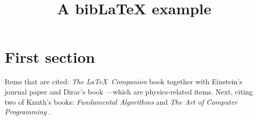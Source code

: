 \documentclass{article}
\title{A bibLaTeX example}
\begin{document}
	\section{First section}
	
	Items that are cited: \textit{The \LaTeX\ Companion} book \cite{latexcompanion} together with Einstein's journal paper \cite{einstein} and Dirac's book \cite{dirac}---which are physics-related items. Next, citing two of Knuth's books: \textit{Fundamental Algorithms} \cite{knuth-fa} and \textit{The Art of Computer Programming} \cite{knuth-acp}.
	
	\medskip
	
	\printbibliography
\end{document}

